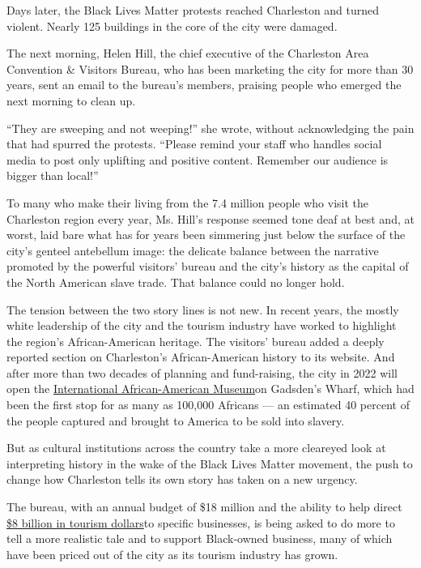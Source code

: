 Days later, the Black Lives Matter protests reached Charleston and
turned violent. Nearly 125 buildings in the core of the city were
damaged.

The next morning, Helen Hill, the chief executive of the Charleston Area
Convention \& Visitors Bureau, who has been marketing the city for more
than 30 years, sent an email to the bureau's members, praising people
who emerged the next morning to clean up.

``They are sweeping and not weeping!'' she wrote, without acknowledging
the pain that had spurred the protests. ``Please remind your staff who
handles social media to post only uplifting and positive content.
Remember our audience is bigger than local!''

To many who make their living from the 7.4 million people who visit the
Charleston region every year, Ms. Hill's response seemed tone deaf at
best and, at worst, laid bare what has for years been simmering just
below the surface of the city's genteel antebellum image: the delicate
balance between the narrative promoted by the powerful visitors' bureau
and the city's history as the capital of the North American slave trade.
That balance could no longer hold.

The tension between the two story lines is not new. In recent years, the
mostly white leadership of the city and the tourism industry have worked
to highlight the region's African-American heritage. The visitors'
bureau added a deeply reported section on Charleston's African-American
history to its website. And after more than two decades of planning and
fund-raising, the city in 2022 will open the
\href{https://www.nytimes3xbfgragh.onion/2018/03/28/arts/charleston-international-african-american-museum.html}{International
African-American Museum}on Gadsden's Wharf, which had been the first
stop for as many as 100,000 Africans --- an estimated 40 percent of the
people captured and brought to America to be sold into slavery.

But as cultural institutions across the country take a more cleareyed
look at interpreting history in the wake of the Black Lives Matter
movement, the push to change how Charleston tells its own story has
taken on a new urgency.

The bureau, with an annual budget of \$18 million and the ability to
help direct
\href{https://www.postandcourier.com/business/visitors-to-charleston-broke-records-again-exceeding-7-2-million-last-year/article_7e0c7d14-57b0-11e9-a912-671dd61d9f4a.html}{\$8
billion in tourism dollars}to specific businesses, is being asked to do
more to tell a more realistic tale and to support Black-owned business,
many of which have been priced out of the city as its tourism industry
has grown.

